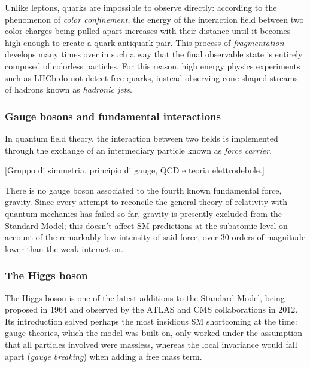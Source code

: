 Unlike leptons, quarks are impossible to observe directly: according to the phenomenon of \textit{color confinement}, the energy of the interaction field between two color charges being pulled apart increases with their distance until it becomes high enough to create a quark-antiquark pair.
This process of \textit{fragmentation} develops many times over in such a way that the final observable state is entirely composed of colorless particles.
For this reason, high energy physics experiments such as LHCb do not detect free quarks, instead observing cone-shaped streams of hadrons known as \textit{hadronic jets}.

\subsubsection{Gauge bosons and fundamental interactions}
In quantum field theory, the interaction between two fields is implemented through the exchange of an intermediary particle known as \textit{force carrier}. 




[Gruppo di simmetria, principio di gauge, QCD e teoria elettrodebole.]

There is no gauge boson associated to the fourth known fundamental force, gravity.
Since every attempt to reconcile the general theory of relativity with quantum mechanics has failed so far, gravity is presently excluded from the Standard Model;
this doesn't affect SM predictions at the subatomic level on account of the remarkably low intensity of said force, over 30 orders of magnitude lower than the weak interaction.

\subsubsection{The Higgs boson}
The Higgs boson is one of the latest additions to the Standard Model, being proposed in 1964 and observed by the ATLAS and CMS collaborations in 2012.
Its introduction solved perhaps the most insidious SM shortcoming at the time: gauge theories, which the model was built on, only worked under the assumption that all particles involved were massless, whereas the local invariance would fall apart (\textit{gauge breaking}) when adding a free mass term.

